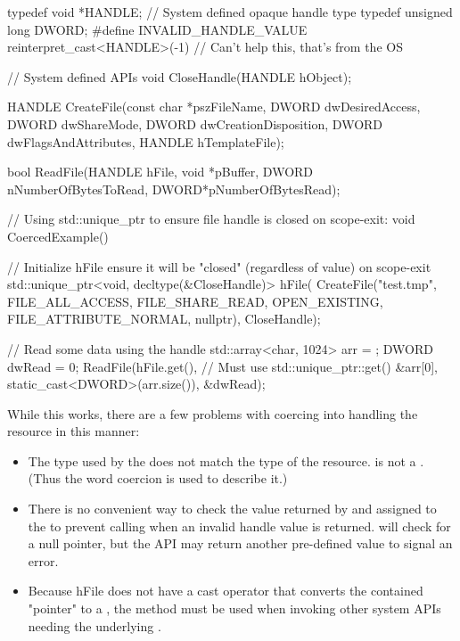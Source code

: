 \documentclass[ebook,11pt,article]{memoir}
\begin{document}
\begin{codeblock}
typedef void *HANDLE;        // System defined opaque handle type
typedef unsigned long DWORD;
#define INVALID_HANDLE_VALUE reinterpret_cast<HANDLE>(-1)	
// Can't help this, that's from the OS

// System defined APIs
void CloseHandle(HANDLE hObject);

HANDLE CreateFile(const char *pszFileName, 
	DWORD dwDesiredAccess, 
	DWORD dwShareMode, 
	DWORD dwCreationDisposition, 
	DWORD dwFlagsAndAttributes, 
	HANDLE hTemplateFile);

bool ReadFile(HANDLE hFile, 
	void *pBuffer, 
	DWORD nNumberOfBytesToRead, 
	DWORD*pNumberOfBytesRead);

// Using std::unique_ptr to ensure file handle is closed on scope-exit:
void CoercedExample()
{
	// Initialize hFile ensure it will be "closed" (regardless of value) on scope-exit
	std::unique_ptr<void, decltype(&CloseHandle)> hFile(
		CreateFile("test.tmp", 
			FILE_ALL_ACCESS, 
			FILE_SHARE_READ, 
			OPEN_EXISTING, 
			FILE_ATTRIBUTE_NORMAL,
			nullptr), 
		CloseHandle);

	// Read some data using the handle
	std::array<char, 1024> arr = { };
	DWORD dwRead = 0;
	ReadFile(hFile.get(),	// Must use std::unique_ptr::get()
		&arr[0], 
		static_cast<DWORD>(arr.size()), 
		&dwRead);
}
\end{codeblock}

While this works, there are a few problems with coercing  into handling the resource in this manner:
\begin{itemize}
\item The type used by the  does not match the type of the resource.   is not a .  (Thus the word coercion is used to describe it.)
\item There is no convenient way to check the value returned by  and assigned to the  to prevent calling  when an invalid handle value is returned.   will check for a null pointer, but the  API may return another pre-defined value to signal an error.
\item Because hFile does not have a cast operator that converts the contained "pointer" to a , the  method must be used when invoking other system APIs needing the underlying .
\end{itemize}
\end{document}
